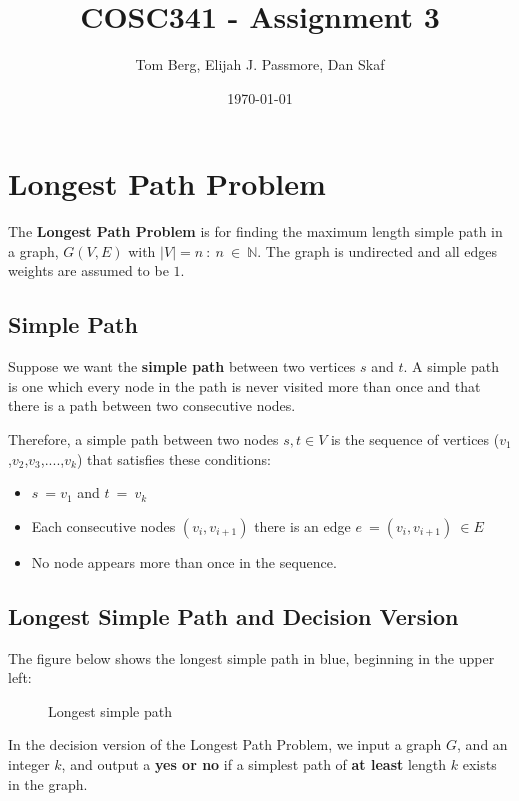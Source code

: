 \documentclass[a4paper,11pt]{article}
\title{COSC341 - Assignment 3}
\author{Tom Berg, Elijah J. Passmore, Dan Skaf}
\date{\today}
\begin{document}
\maketitle
\tableofcontents

\section{Longest Path Problem}

The \textbf{Longest Path Problem} is for finding the maximum length simple path
in a graph, $G(V,E)$ with $\left|V\right|=n\::\:n\:\in\:\mathbb{N}$.  The graph
is undirected and all edges weights are assumed to be $1$.

\subsection{Simple Path}

Suppose we want the \textbf{simple path} between two vertices $s$ and $t$.  A
simple path is one which every node in the path is never visited more than once
and that there is a path between two consecutive nodes.

Therefore, a simple path between two nodes $s,t\in V$ is the sequence of
vertices ($v_1$,$v_2$,$v_3$,$....$,$v_k$) that satisfies these conditions:
\pagebreak

\begin{itemize}
    \item $s\:=v_1$ and $t\:=\:v_k$
    \item Each consecutive nodes $\left(v_i,v_{i+1}\right)$ there is an edge
          $e\:=\left(v_i,v_{i+1}\right)\:\in E$
    \item No node appears more than once in the sequence.
\end{itemize}

\subsection{Longest Simple Path and Decision Version}

The figure below shows the longest simple path in blue, beginning in the upper
left:

\begin{figure}[!h]
    \centering {}
    \caption{Longest simple path}
\end{figure}

In the decision version of the Longest Path Problem, we input a graph $G$, and
an integer $k$, and output a \textbf{yes or no} if a simplest path of
\textbf{at least} length $k$ exists in the graph.
\end{document}
